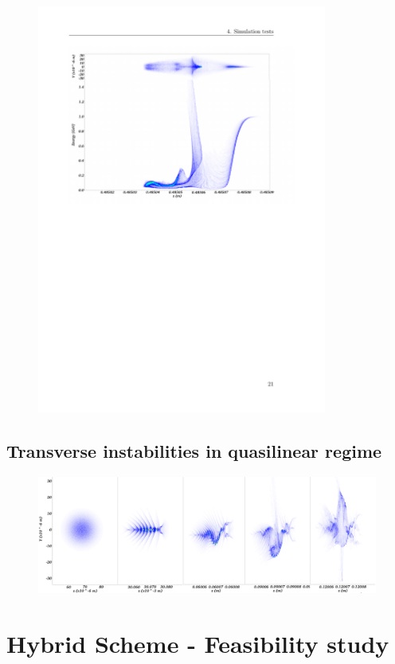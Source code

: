 \begin{figure}
\centering
\includegraphics[width=0.85\textwidth]{bunch_and_energy_48cm.pdf}
\end{figure}
\subsection{Transverse instabilities in quasilinear regime}
\begin{figure}
\centering
\includegraphics[width=\textwidth]{cherenkov_instability}
\end{figure}
\section{Hybrid Scheme - Feasibility study}
